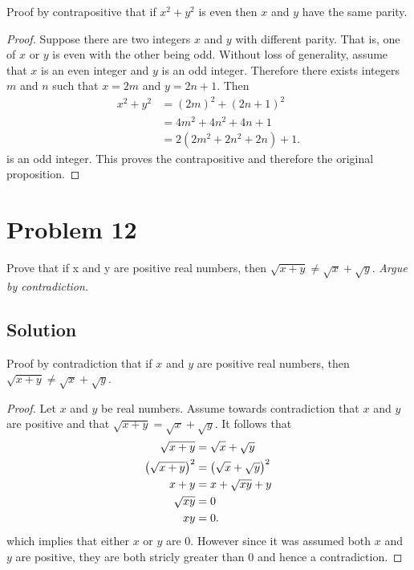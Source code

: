 \documentclass[12pt]{extarticle}
\begin{document}


Proof by contrapositive that if $x^2 + y^2$ is even then $x$ and $y$ have the same parity.
\begin{proof}
	Suppose there are two integers $x$ and $y$ with different parity. That is, one of $x$ or $y$ is even with the other being odd. Without loss of generality, assume that $x$ is an even integer and $y$ is an odd integer. Therefore there exists integers $m$ and $n$ such that $x = 2m$ and $y=2n+1$. Then
	\begin{align*}
		x^2 + y^2 &= (2m)^2 + (2n+1)^2 \\
							&= 4m^2 + 4n^2 + 4n + 1 \\
							&= 2(2m^2 + 2n^2 + 2n) + 1.
	\end{align*}
	is an odd integer. This proves the contrapositive and therefore the original proposition.
\end{proof}

\section*{Problem 12}

Prove that if x and y are positive real numbers, then $\sqrt{x+y} \neq \sqrt{x} + \sqrt{y}$. \textit{Argue by contradiction.}

\subsection*{Solution}

Proof by contradiction that if $x$ and $y$ are positive real numbers, then $\sqrt{x+y} \neq \sqrt{x} + \sqrt{y}$.

\begin{proof}
	Let $x$ and $y$ be  real numbers. Assume towards contradiction that $x$ and $y$ are positive and that $\sqrt{x + y} = \sqrt{x} + \sqrt{y}$. It follows that
	\begin{align*}
		\sqrt{x+y} &= \sqrt{x} + \sqrt{y} \\
		\qty(\sqrt{x+y})^2 &= \qty(\sqrt{x} + \sqrt{y})^2 \\
		x+y &= x + \sqrt{xy} + y \\
		\sqrt{xy} &= 0 \\
		xy &= 0.
	\end{align*}
	which implies that either $x$ or $y$ are 0. However since it was assumed both $x$ and $y$ are positive, they are both stricly greater than 0 and hence a contradiction.
\end{proof}
\end{document}
